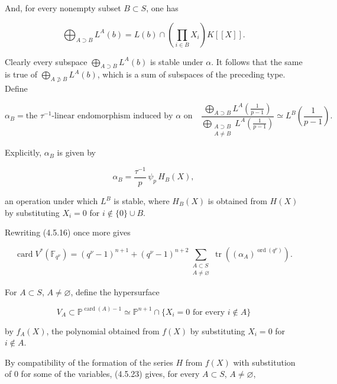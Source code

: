 \par\medskip
And, for every nonempty subset $B\subset S$, one has

\begin{equation}\tag{4.5.20}
\bigoplus_{A\supset B}L^A(b)
=L(b)\cap\left(\prod_{i\in B}X_i\right)K[[X]].
\end{equation}

Clearly every subspace $\bigoplus_{A\supset B}L^A(b)$ is stable under
$\alpha$. It follows that the same is true of
$\bigoplus_{A\not\supset B}L^A(b)$, which is a sum of subspaces of the
preceding type. Define

\begin{equation}\tag{4.5.21}
\alpha_B=\text{the $\tau^{-1}$-linear endomorphism induced by $\alpha$ on}
\quad
\frac{\displaystyle\bigoplus_{A\supset B}
L^A\!\left(\frac1{p-1}\right)}
{\displaystyle\bigoplus_{\substack{A\supset B\\A\ne B}}
L^A\!\left(\frac1{p-1}\right)}
\simeq L^B\!\left(\frac1{p-1}\right).
\end{equation}

Explicitly, $\alpha_B$ is given by

\begin{equation}\tag{4.5.22}
\alpha_B=\frac{\tau^{-1}}p\,\psi_p\,H_B(X),
\end{equation}

an operation under which $L^B$ is stable, where $H_B(X)$ is obtained from
$H(X)$ by substituting $X_i=0$ for $i\notin\{0\}\cup B$.

Rewriting (4.5.16) once more gives

\begin{equation}\tag{4.5.23}
\operatorname{card}V^*(\mathbb F_{q^\nu})
=(q^\nu-1)^{n+1}
+(q^\nu-1)^{n+2}
\sum_{\substack{A\subset S\\A\ne\varnothing}}
\operatorname{tr}\!\left((\alpha_A)^{\operatorname{ord}(q^\nu)}\right).
\end{equation}

For $A\subset S$, $A\ne\varnothing$, define the hypersurface

\begin{equation}\tag{4.5.24}
V_A\subset\mathbb P^{\operatorname{card}(A)-1}
\simeq
\mathbb P^{n+1}\cap
\{X_i=0\text{ for every }i\notin A\}
\end{equation}

by $f_A(X)$, the polynomial obtained from $f(X)$ by substituting $X_i=0$
for $i\notin A$.

By compatibility of the formation of the series $H$ from $f(X)$ with
substitution of $0$ for some of the variables, (4.5.23) gives, for every
$A\subset S$, $A\ne\varnothing$,

